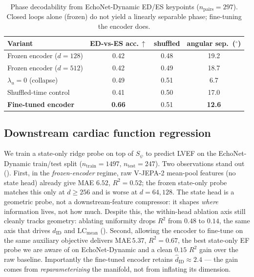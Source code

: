 \documentclass[runningheads]{llncs}
\begin{document}
\begin{table}[t]
\centering
\caption{Phase decodability from EchoNet-Dynamic ED/ES keypoints
($n_\mathrm{pairs}{=}297$). Closed loops alone (frozen) do not yield a
linearly separable phase; fine-tuning the encoder does.}
\label{tab:phase}
\begin{tabular}{lccc}
\toprule
Variant & ED-vs-ES acc.\,$\uparrow$ & shuffled & angular sep.\ ($^\circ$) \\
\midrule
Frozen encoder ($d{=}128$)        & 0.42 & 0.48 & 19.2 \\
Frozen encoder ($d{=}512$)        & 0.42 & 0.49 & 18.7 \\
$\lambda_u{=}0$ (collapse)        & 0.49 & 0.51 & 6.7  \\
Shuffled-time control             & 0.41 & 0.50 & 17.0 \\
\textbf{Fine-tuned encoder}       & \textbf{0.66} & 0.51 & \textbf{12.6} \\
\bottomrule
\end{tabular}
\end{table}

\subsection{Downstream cardiac function regression}\label{sec:downstream}

We train a state-only ridge probe on top of $S_\psi$ to predict LVEF on
the EchoNet-Dynamic train/test split ($n_\mathrm{train}{=}1497$,
$n_\mathrm{test}{=}247$). Two observations stand out ().
First, in the \emph{frozen-encoder} regime, raw V-JEPA-2 mean-pool
features (no state head) already give MAE $6.52$, $R^2{=}0.52$; the
frozen state-only probe matches this only at $d\!\geq\!256$ and is worse
at $d\!=\!64,128$. The state head is a geometric probe, not a
downstream-feature compressor: it shapes \emph{where} information lives,
not how much. Despite this, the within-head ablation axis still cleanly
tracks geometry: ablating uniformity drops $R^2$ from $0.48$ to $0.14$,
the same axis that drives $\widehat{d}_\mathrm{ID}$ and
$\mathrm{LC}_\mathrm{mean}$ ().
Second, allowing the encoder to fine-tune on the same auxiliary
objective delivers MAE\,$5.37$, $R^2{=}0.67$, the best state-only EF
probe we are aware of on EchoNet-Dynamic and a clean $0.15$ $R^2$ gain
over the raw baseline. Importantly the fine-tuned encoder retains
$\widehat{d}_\mathrm{ID}\!\approx\!2.4$ --- the gain comes from
\emph{reparameterizing} the manifold, not from inflating its dimension.
\end{document}
